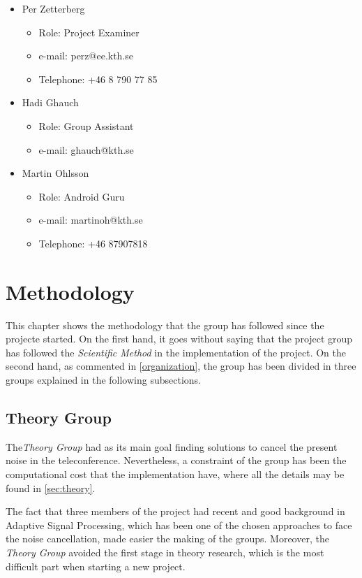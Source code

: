 \documentclass[11pt,a4paper,spanish]{book}  %
\theoremstyle{definition}  %
\theoremstyle{plain}  %
\theoremstyle{remark}  %
\begin{document}
\begin{itemize}
\item Per Zetterberg
	\begin{itemize}
	\item Role: Project Examiner
	\item e-mail: perz@ee.kth.se
	\item Telephone: +46 8 790 77 85
	\end{itemize}
	
\item Hadi Ghauch
	\begin{itemize}
	\item Role: Group Assistant
	\item e-mail: ghauch@kth.se
	\end{itemize}
	
\item Martin Ohlsson
	\begin{itemize}
	\item Role: Android Guru
	\item e-mail: martinoh@kth.se
	\item Telephone: +46 87907818
	\end{itemize}
\end{itemize}

\chapter{Methodology}
\label{sec:methodology}

This chapter shows the methodology that the group has followed since the projecte started. On the first hand, it goes without saying that the project group has followed the \textit{Scientific Method} in the implementation of the project. On the second hand, as commented in \ref{organization}, the group has been divided in three groups explained in the following subsections.

	\section{Theory Group}

The\textit{Theory Group} had as its main goal finding solutions to cancel the present noise in the teleconference. Nevertheless, a constraint of the group has been the computational cost that the implementation have, where all the details may be found in \ref{sec:theory}.

The fact that three members of the project had recent and good background in Adaptive Signal Processing, which has been one of the chosen approaches to face the noise cancellation, made easier the making of the groups. Moreover, the \textit{Theory Group} avoided the first stage in theory research, which is the most difficult part when starting a new project.
\end{document}
